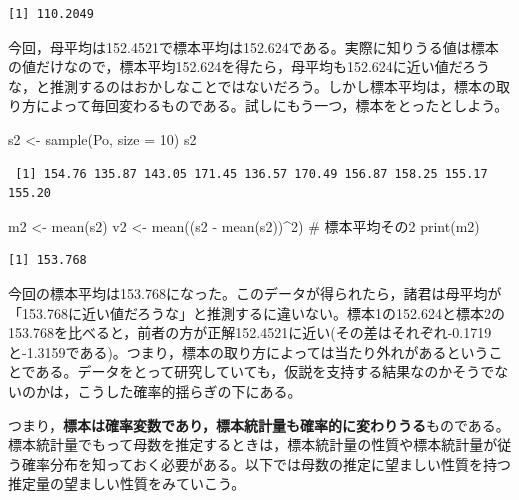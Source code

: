 \documentclass[
  a4paper,
]{ltjsbook}
\newenvironment{Shaded}{\begin{snugshade}}{\end{snugshade}}
\newcommand{\AttributeTok}[1]{\textcolor[rgb]{0.40,0.45,0.13}{#1}}
\newcommand{\CommentTok}[1]{\textcolor[rgb]{0.37,0.37,0.37}{#1}}
\newcommand{\DecValTok}[1]{\textcolor[rgb]{0.68,0.00,0.00}{#1}}
\newcommand{\FunctionTok}[1]{\textcolor[rgb]{0.28,0.35,0.67}{#1}}
\newcommand{\NormalTok}[1]{\textcolor[rgb]{0.00,0.23,0.31}{#1}}
\newcommand{\OtherTok}[1]{\textcolor[rgb]{0.00,0.23,0.31}{#1}}
\newcommand{\SpecialCharTok}[1]{\textcolor[rgb]{0.37,0.37,0.37}{#1}}
\begin{document}
\begin{verbatim}
[1] 110.2049
\end{verbatim}

今回，母平均は152.4521で標本平均は152.624である。実際に知りうる値は標本の値だけなので，標本平均152.624を得たら，母平均も152.624に近い値だろうな，と推測するのはおかしなことではないだろう。しかし標本平均は，標本の取り方によって毎回変わるものである。試しにもう一つ，標本をとったとしよう。

\begin{Shaded}
\begin{Highlighting}[]
\NormalTok{s2 }\OtherTok{\textless{}{-}} \FunctionTok{sample}\NormalTok{(Po, }\AttributeTok{size =} \DecValTok{10}\NormalTok{)}
\NormalTok{s2}
\end{Highlighting}
\end{Shaded}

\begin{verbatim}
 [1] 154.76 135.87 143.05 171.45 136.57 170.49 156.87 158.25 155.17 155.20
\end{verbatim}

\begin{Shaded}
\begin{Highlighting}[]
\NormalTok{m2 }\OtherTok{\textless{}{-}} \FunctionTok{mean}\NormalTok{(s2)}
\NormalTok{v2 }\OtherTok{\textless{}{-}} \FunctionTok{mean}\NormalTok{((s2 }\SpecialCharTok{{-}} \FunctionTok{mean}\NormalTok{(s2))}\SpecialCharTok{\^{}}\DecValTok{2}\NormalTok{)}
\CommentTok{\# 標本平均その2}
\FunctionTok{print}\NormalTok{(m2)}
\end{Highlighting}
\end{Shaded}

\begin{verbatim}
[1] 153.768
\end{verbatim}

今回の標本平均は153.768になった。このデータが得られたら，諸君は母平均が「153.768に近い値だろうな」と推測するに違いない。標本1の152.624と標本2の153.768を比べると，前者の方が正解152.4521に近い(その差はそれぞれ-0.1719と-1.3159である)。つまり，標本の取り方によっては当たり外れがあるということである。データをとって研究していても，仮説を支持する結果なのかそうでないのかは，こうした確率的揺らぎの下にある。

つまり，\textbf{標本は確率変数であり，標本統計量も確率的に変わりうる}ものである。標本統計量でもって母数を推定するときは，標本統計量の性質や標本統計量が従う確率分布を知っておく必要がある。以下では母数の推定に望ましい性質を持つ推定量の望ましい性質をみていこう。
\end{document}

